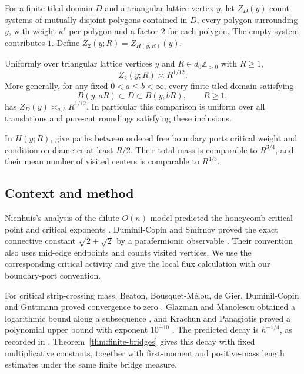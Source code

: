 For a finite tiled domain $D$ and a triangular lattice vertex $y$, let $Z_D(y)$ count systems of mutually disjoint polygons contained in $D$, every polygon surrounding $y$, with weight $\kappa^\ell$ per polygon and a factor $2$ for each polygon. The empty system contributes $1$. Define $Z_2(y;R)=Z_{H(y;R)}(y)$.

\begin{theorem}\label{thm:nesting}
Uniformly over triangular lattice vertices $y$ and $R\in d_0\mathbb Z_{>0}$ with $R\ge1$,
\[
 Z_2(y;R)\asymp R^{1/12}.
\]
More generally, for any fixed $0<a\le b<\infty$, every finite tiled domain satisfying
\[
 B(y,aR)\subset D\subset B(y,bR),\qquad R\ge1,
\]
has $Z_D(y)\asymp_{a,b}R^{1/12}$. In particular this comparison is uniform over all translations and pure-cut roundings satisfying these inclusions.

In $H(y;R)$, give paths between ordered free boundary ports critical weight and condition on diameter at least $R/2$. Their total mass is comparable to $R^{3/4}$, and their mean number of visited centers is comparable to $R^{4/3}$.
\end{theorem}

\subsection{Context and method}

Nienhuis's analysis of the dilute $O(n)$ model predicted the honeycomb critical point and critical exponents \cite{Nienhuis1982}. Duminil-Copin and Smirnov proved the exact connective constant $\sqrt{2+\sqrt2}$ by a parafermionic observable \cite{DuminilCopinSmirnov2012}. Their convention also uses mid-edge endpoints and counts visited vertices. We use the corresponding critical activity and give the local flux calculation with our boundary-port convention.

For critical strip-crossing mass, Beaton, Bousquet-M\'elou, de Gier, Duminil-Copin and Guttmann proved convergence to zero \cite[Theorem~10]{BeatonEtAl2014}. Glazman and Manolescu obtained a logarithmic bound along a subsequence \cite[Proposition~1.1]{GlazmanManolescu2017}, and Krachun and Panagiotis proved a polynomial upper bound with exponent $10^{-10}$ \cite{KrachunPanagiotis2026}. The predicted decay is $h^{-1/4}$, as recorded in \cite{GlazmanManolescu2017}. Theorem~\ref{thm:finite-bridges} gives this decay with fixed multiplicative constants, together with first-moment and positive-mass length estimates under the same finite bridge measure.

